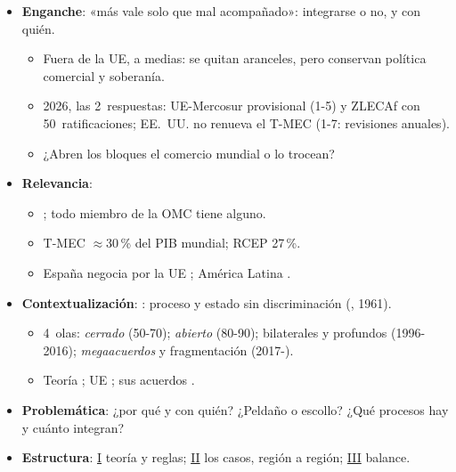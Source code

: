 \documentclass{article}
\begin{document}
\cabecerarepaso
\begin{columnas}

\begin{itemize}
\item \textbf{Enganche}: «más vale solo que mal acompañado»: integrarse o no, y con quién.
  \begin{itemize}
  \item Fuera de la UE, a medias: se quitan aranceles, pero conservan política comercial y soberanía.
  \item 2026, las 2~respuestas: UE-Mercosur provisional (1-5) y ZLECAf con 50~ratificaciones; EE.~UU. no renueva el T-MEC (1-7: revisiones anuales).
  \item ¿Abren los bloques el comercio mundial o lo trocean?
  \end{itemize}
\item \textbf{Relevancia}:
  \begin{itemize}
  \item {}; todo miembro de la OMC tiene alguno.
  \item T-MEC $\approx$30\,\% del PIB mundial; RCEP 27\,\%.
  \item España negocia por la UE ; América Latina .
  \end{itemize}
\item \textbf{Contextualización}: : proceso y estado sin discriminación (, 1961).
  \begin{itemize}
  \item 4~olas: \emph{cerrado} (50-70); \emph{abierto} (80-90); bilaterales y profundos (1996-2016); \emph{megaacuerdos} y fragmentación (2017-).
  \item Teoría ; UE ; sus acuerdos .
  \end{itemize}
\item \textbf{Problemática}: ¿por qué y con quién? ¿Peldaño o escollo? ¿Qué procesos hay y cuánto integran?
\item \textbf{Estructura}: \hyperref[rep:I]{I} teoría y reglas; \hyperref[rep:II]{II} los casos, región a región; \hyperref[rep:III]{III} balance.
\end{itemize}


\end{columnas}
\end{document}
